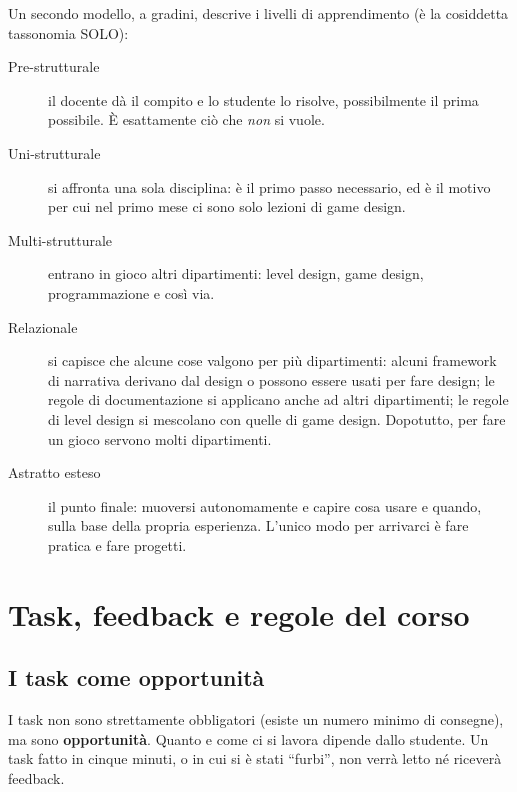 

Un secondo modello, a gradini, descrive i livelli di apprendimento (è la
cosiddetta tassonomia SOLO):
\begin{description}
  \item[Pre-strutturale] il docente dà il compito e lo studente lo risolve,
        possibilmente il prima possibile. È esattamente ciò che \emph{non} si
        vuole.
  \item[Uni-strutturale] si affronta una sola disciplina: è il primo passo
        necessario, ed è il motivo per cui nel primo mese ci sono solo lezioni
        di game design.
  \item[Multi-strutturale] entrano in gioco altri dipartimenti: level design,
        game design, programmazione e così via.
  \item[Relazionale] si capisce che alcune cose valgono per più
        dipartimenti: alcuni framework di narrativa derivano dal design o
        possono essere usati per fare design; le regole di documentazione si
        applicano anche ad altri dipartimenti; le regole di level design si
        mescolano con quelle di game design. Dopotutto, per fare un gioco
        servono molti dipartimenti.
  \item[Astratto esteso] il punto finale: muoversi autonomamente e capire
        cosa usare e quando, sulla base della propria esperienza. L'unico modo
        per arrivarci è fare pratica e fare progetti.
\end{description}

\section{Task, feedback e regole del corso}
\label{sec:task-feedback}

\subsection{I task come opportunità}

I task non sono strettamente obbligatori (esiste un numero minimo di
consegne), ma sono \textbf{opportunità}. Quanto e come ci si lavora dipende
dallo studente. Un task fatto in cinque minuti, o in cui si è stati ``furbi'',
non verrà letto né riceverà feedback.

